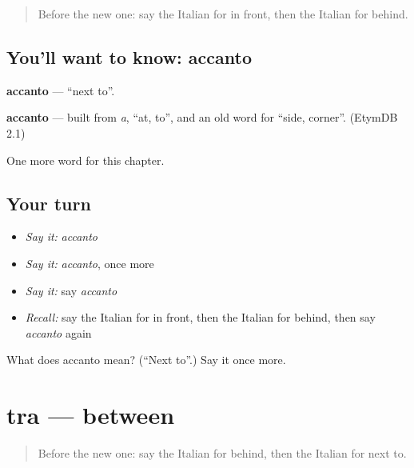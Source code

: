 \label{lesson:IT-C91-accanto}



\begin{quote}
Before the new one: say the Italian for in front, then the Italian for behind.
\end{quote}

\subsection*{You'll want to know: accanto}
\textbf{accanto} — \textquotedblleft{}next to\textquotedblright{}.

\begin{cousinweb}
\textbf{accanto} — built from \emph{a}, \textquotedblleft{}at, to\textquotedblright{}, and an old word for \textquotedblleft{}side, corner\textquotedblright{}. (EtymDB 2.1)
\end{cousinweb}

\begin{grammarlens}[title={What you've built}]
One more word for this chapter.
\end{grammarlens}

\subsection*{Your turn}
\begin{itemize}
\raggedright
  \item \emph{Say it:} \emph{accanto}
  \item \emph{Say it:} \emph{accanto}, once more
  \item \emph{Say it:} say \emph{accanto}
  \item \emph{Recall:} say the Italian for in front, then the Italian for behind, then say \emph{accanto} again
\end{itemize}

\begin{tcolorbox}[breakable,colback=teal!4,colframe=teal!35!black,title={Before you move on}]
What does accanto mean? (\textquotedblleft{}Next to\textquotedblright{}.) Say it once more.
\end{tcolorbox}
\section[tra]{tra — between}

\label{lesson:IT-C91-tra}



\begin{quote}
Before the new one: say the Italian for behind, then the Italian for next to.
\end{quote}

